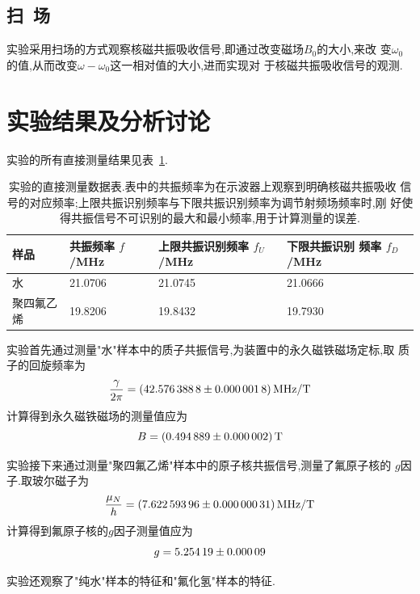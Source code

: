 \documentclass[aps,pre,12pt,preprint,onecolumn,showpacs,showkeys]{revtex4-1}
\begin{document}
\subsection{扫~场}

实验采用扫场的方式观察核磁共振吸收信号,即通过改变磁场$B_0$的大小,来改
变$\omega_0$的值,从而改变$\omega-\omega_0$这一相对值的大小,进而实现对
于核磁共振吸收信号的观测.


\section{实验结果及分析讨论}

实验的所有直接测量结果见表~\ref{tab:rawdata}.

\begin{table}[t]
\caption{\label{tab:rawdata}%
实验的直接测量数据表.表中的共振频率为在示波器上观察到明确核磁共振吸收
信号的对应频率;上限共振识别频率与下限共振识别频率为调节射频场频率时,刚
好使得共振信号不可识别的最大和最小频率,用于计算测量的误差.}
\begin{ruledtabular}
\begin{tabular}{llll}
样品 & 共振频率 $f$/MHz & 上限共振识别频率  $f_{U}$/MHz & 下限共振识别
频率 $f_{D}$/MHz \\ \hline
水 & 21.0706 & 21.0745 & 21.0666 \\
聚四氟乙烯 & 19.8206 & 19.8432 & 19.7930
\end{tabular}\end{ruledtabular}
\end{table}

实验首先通过测量"水"样本中的质子共振信号,为装置中的永久磁铁磁场定标,取
质子的回旋频率为\cite{book}
\begin{equation}
\frac{\gamma}{2\pi} = \SI{42.5763888 \pm
  0.0000018}{MHz/T}
\end{equation}
计算得到永久磁铁磁场的测量值应为
\begin{equation}
B = \SI{0.494889 \pm 0.000002}{T}
\end{equation}

实验接下来通过测量"聚四氟乙烯"样本中的原子核共振信号,测量了氟原子核的
$g$因子.取玻尔磁子为\cite{book}
\begin{equation}
\frac{\mu_N}{h} = \SI{7.62259396 \pm 0.00000031}{MHz/T}
\end{equation}
计算得到氟原子核的$g$因子测量值应为
\begin{equation}
g = \num{5.25419 \pm 0.00009}
\end{equation}

实验还观察了"纯水"样本的特征和"氟化氢"样本的特征.
\end{document}
